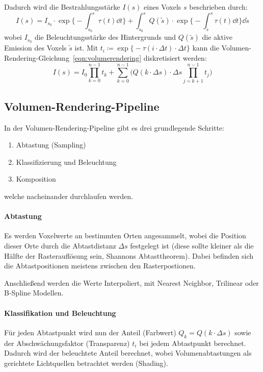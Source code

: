 			Dadurch wird die Bestrahlungsstärke \( I(s) \) eines Voxels \(s\) beschrieben durch:
			\begin{equation}
				I(s) = I_{s_0} \cdot \exp \Bigg\{ -\int_{s_0}^{s} \! \tau(t) \dd{t} \Bigg\} + \int_{s_0}^{s} \! Q(\tilde{s}) \cdot \exp \Bigg\{ -\int_{\tilde{s}}^{s} \tau(t) \dd{t} \Bigg\} \dd{\tilde{s}}  \label{eqn:volumerendering}
			\end{equation}
			wobei \( I_{s_0} \) die Beleuchtungsstärke des Hintergrunds und \( Q(\tilde{s}) \) die aktive Emission des Voxels \( \tilde{s} \) ist. Mit \( t_i \coloneqq \exp\Big\{ -\tau(i \cdot \Delta t) \cdot \Delta t \Big\} \) kann die Volumen-Rendering-Gleichung~\ref{eqn:volumerendering} diskretisiert werden:
			\begin{equation}
				I(s) = I_0 \prod_{k = 0}^{n - 1} t_k + \sum_{k = 0}^{n - 1} \Bigg( Q(k \cdot \Delta s) \cdot \Delta s \prod_{j = k + 1}^{n - 1} t_j \Bigg)  \label{eqn:volumerenderingdiscrete}
			\end{equation}

		\subsection{Volumen-Rendering-Pipeline}
			In der Volumen-Rendering-Pipeline gibt es drei grundlegende Schritte:
			\begin{enumerate}
				\item Abtastung (Sampling)
				\item Klassifizierung und Beleuchtung
				\item Komposition
			\end{enumerate}
			welche nacheinander durchlaufen werden.

			\paragraph{Abtastung}
				Es werden Voxelwerte an bestimmten Orten angesammelt, wobei die Position dieser Orte durch die Abtastdistanz \( \Delta s \) festgelegt ist (diese sollte kleiner als die Hälfte der Rasterauflösung sein, Shannons Abtasttheorem). Dabei befinden sich die Abtastpositionen meistens zwischen den Rasterpostionen.
				
				Anschließend werden die Werte Interpoliert, \bspw mit Nearest Neighbor, Trilinear oder B-Spline Modellen.

			\paragraph{Klassifikation und Beleuchtung}
				Für jeden Abtastpunkt wird nun der Anteil (Farbwert) \( Q_k = Q(k \cdot \Delta s) \) sowie der Abschwächungsfaktor (Transparenz) \( t_i \) bei jedem Abtastpunkt berechnet. Dadurch wird der beleuchtete Anteil berechnet, wobei Volumenabtastungen als gerichtete Lichtquellen betrachtet werden (Shading).


